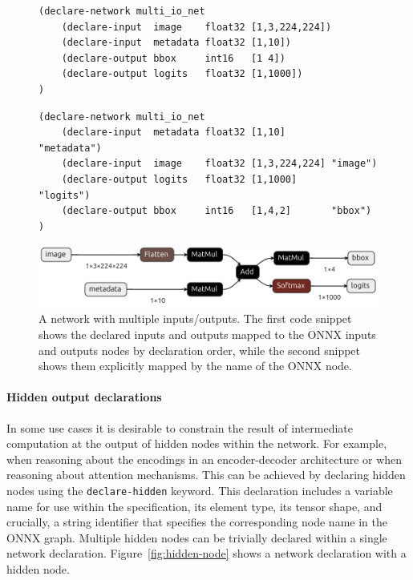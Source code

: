 \begin{figure}[h!]
    \centering
    \begin{lstlisting}[style=lbnf]
(declare-network multi_io_net
    (declare-input  image    float32 [1,3,224,224])
    (declare-input  metadata float32 [1,10])
    (declare-output bbox     int16   [1 4])
    (declare-output logits   float32 [1,1000])
)\end{lstlisting}

    \begin{lstlisting}[style=lbnf]
(declare-network multi_io_net
    (declare-input  metadata float32 [1,10]        "metadata")
    (declare-input  image    float32 [1,3,224,224] "image")
    (declare-output logits   float32 [1,1000]      "logits")
    (declare-output bbox     int16   [1,4,2]       "bbox")
)\end{lstlisting}

    \vspace{0.5cm}
    \includegraphics[width=\textwidth]{imgs/multi_io_net.onnx.png}
    \caption{A network with multiple inputs/outputs. The first code snippet shows the declared inputs and outputs mapped to the ONNX inputs and outputs nodes by declaration order, while the second snippet shows them explicitly mapped by the name of the ONNX node.}
    \label{fig:multi-inputs-outputs}
\end{figure}


\paragraph{Hidden output declarations}
\label{sec:hidden-output-declarations}

In some use cases it is desirable to constrain the result of intermediate computation at the output of hidden nodes within the network. For example, when reasoning about the encodings in an encoder-decoder architecture or when reasoning about attention mechanisms. This can be achieved by declaring hidden nodes using the \texttt{declare-hidden} keyword. This declaration includes a variable name for use within the \vnnlib{} specification,  its element type, its tensor shape, and crucially, a string identifier that specifies the corresponding node name in the ONNX graph.  Multiple hidden nodes can be trivially declared within a single network declaration. Figure~\ref{fig:hidden-node} shows a \vnnlib{} network declaration with a hidden node.

